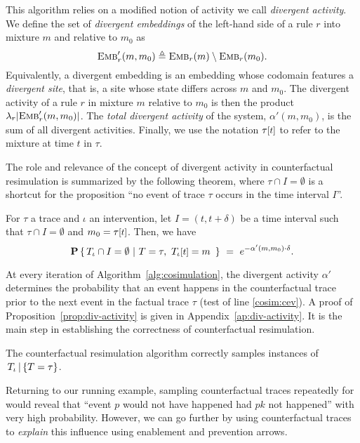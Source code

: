This algorithm relies on a modified notion of activity we call
\emph{divergent activity}. We define the set of \emph{divergent
  embeddings} of the left-hand side of a rule $r$ into mixture $m$
and relative to $m_0$ as
\[{\textsc{Emb}}'_{r}(m, m_0) \triangleq {\textsc{Emb}}_{r}(m) \setminus {\textsc{Emb}}_{r}(m_0).\]
Equivalently, a divergent embedding is an embedding whose codomain
features a \emph{divergent site}, that is, a site whose state differs
across $m$ and $m_0$. The {divergent activity} of a rule $r$ in
mixture $m$ relative to $m_0$ is then the product
$\lambda_r|{\textsc{Emb}}'_{r}(m, m_0)|$. The \emph{total divergent activity} of
the system, $\alpha'(m, m_0)$, is the sum of all divergent
activities. Finally, we use the notation $\TSTATE{t}{\tau}$ to refer
to the mixture at time $t$ in $\tau$.



The role and relevance of the concept of divergent activity in
counterfactual resimulation is summarized by the
following theorem, where $\tau \cap I = \emptyset$ is a
shortcut for the proposition ``no event of trace $\tau$ occurs in
the time interval $I$''.
\begin{proposition}\label{prop:div-activity}
  For $\tau$ a trace
  and $\iota$ an intervention, let $I = (t, t+\delta)$ be a time interval
  such that $\tau \cap I = \emptyset$ and $m_0 =
  \TSTATE{t}{\tau}$. Then, we have
  \[\CProb{ \ATRAJ{} \cap I = \emptyset }{ T=\tau,\
      \TSTATE{t}{\ATRAJ{}} = m\ }
    \ =\ e^{-\alpha'(m, m_0) \cdot \delta}.
  \]
\end{proposition}
\noindent At every iteration of Algorithm~\ref{alg:cosimulation}, the
divergent activity $\alpha'$ determines the probability that an event
happens in the counterfactual trace prior to the next event in the
factual trace $\tau$ (test of line \ref{cosim:cev}).  A proof of
Proposition~\ref{prop:div-activity} is given in
Appendix~\ref{ap:div-activity}. It is the main step
in establishing the correctness of counterfactual resimulation.

\begin{theorem}%
  The counterfactual resimulation algorithm correctly
  samples instances of $\,{T_\iota\,|\,\{T=\tau\}}{}$.
\end{theorem}



Returning to our running example, sampling counterfactual traces
repeatedly for \RefTrace{} would reveal that ``event $p$ would not
have happened had $pk$ not happened'' with very high probability.
However, we can go further by using counterfactual traces to
\textit{explain} this influence using enablement and prevention
arrows.
